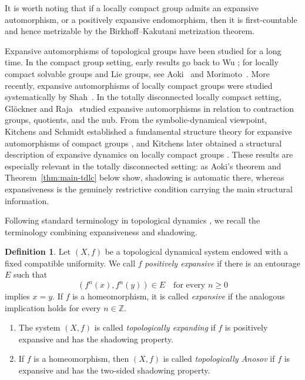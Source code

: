 \documentclass[12pt]{amsart}
\theoremstyle{definition}
\newtheorem{definition}[theorem]{Definition}
\numberwithin{equation}{section}
\theoremstyle{remark}
\begin{document}
It is worth noting that if a locally compact group admits an expansive
automorphism, or a positively expansive endomorphism, then it is
first-countable and hence metrizable by the Birkhoff--Kakutani metrization
theorem.

Expansive automorphisms of topological groups have been studied for a long
time. In the compact group setting, early results go back to Wu
\cite{Wu1966}; for locally compact solvable groups and Lie groups, see
Aoki~\cite{Aoki1979} and Morimoto~\cite{Morimoto1981}. More recently,
expansive automorphisms of locally compact groups were studied
systematically by Shah~\cite{Shah2020}. In the totally disconnected locally
compact setting, Gl\"ockner and Raja~\cite{GlocknerRaja2017,WillisNub} studied
expansive automorphisms in relation to contraction groups, quotients, and
the nub. From the symbolic-dynamical viewpoint, Kitchens and Schmidt
established a fundamental structure theory for expansive automorphisms of
compact groups \cite{Kitchens1987,KS1989}, and Kitchens later obtained a structural
description of expansive dynamics on locally compact groups
\cite{Kitchens2021}. These results are especially relevant in the totally
disconnected setting: as Aoki's theorem and
Theorem~\ref{thm:main-tdlc} below show,
shadowing is automatic there, whereas expansiveness is the genuinely
restrictive condition carrying the main structural information.


Following standard terminology in topological dynamics
\cite{AokiHiraide,DasLeeRichesonWiseman}, we recall the terminology combining
expansiveness and shadowing.

\begin{definition}
Let $(X,f)$ be a topological dynamical system endowed with a fixed
compatible uniformity. We call $f$ \emph{positively expansive} if there is
an entourage $E$ such that
\[
(f^n(x),f^n(y))\in E\quad\text{for every }n\geq 0
\]
implies $x=y$. If $f$ is a homeomorphism, it is called \emph{expansive} if
the analogous implication holds for every $n\in\mathbb Z$.
\begin{enumerate}
\item The system $(X,f)$ is called \emph{topologically expanding} if $f$ is
positively expansive and has the shadowing property.
\item If $f$ is a homeomorphism, then $(X,f)$ is called
\emph{topologically Anosov} if $f$ is expansive and has the two-sided
shadowing property.
\end{enumerate}
\end{definition}
\end{document}
